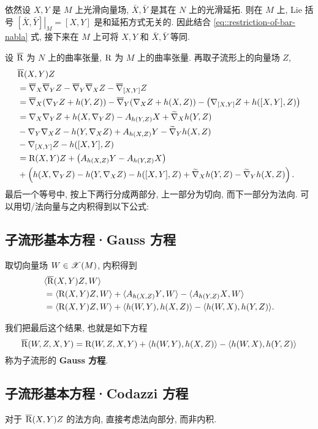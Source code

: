 \documentclass{ctexart}
\begin{document}
依然设 $X, Y$ 是 $M$ 上光滑向量场, $\bar{X}, \bar{Y}$ 是其在 $N$ 上的光滑延拓. 则在 $M$ 上, Lie 括号 $\left.[\bar{X}, \bar{Y}]\right|_{M} = [X, Y]$ 是和延拓方式无关的. 因此结合 \ref{eq::restriction-of-bar-nabla} 式, 接下来在 $M$ 上可将 $X, Y$ 和 $\bar{X}, \bar{Y}$ 等同.

设 $\overline{\mathrm{R}}$ 为 $N$ 上的曲率张量, $\mathrm{R}$ 为 $M$ 上的曲率张量. 再取子流形上的向量场 $Z$,
\begin{align*}
	&\overline{\mathrm{R}}(X, Y)Z \\
	&= \overline{\nabla}_{X}{\overline{\nabla}_{Y}{Z}} - \overline{\nabla}_{Y}{\overline{\nabla}_{X}{Z}} - \overline{\nabla}_{[X, Y]}{Z} \\
	&= \overline{\nabla}_{X}{\left(\nabla_{Y}{Z} + h(Y, Z)\right)} - \overline{\nabla}_{Y}{\left(\nabla_{X}{Z} + h(X, Z)\right)} - \left(\nabla_{[X, Y]}{Z} + h([X, Y], Z)\right) \\
	&= \nabla_{X}{\nabla_{Y}{Z}} + h(X, \nabla_{Y}{Z}) - A_{h(Y, Z)}{X} + \widetilde{\nabla}_{X}{h(Y, Z)} \\
	&- \nabla_{Y}{\nabla_{X}{Z}} - h(Y, \nabla_{X}{Z}) + A_{h(X, Z)}{Y} - \widetilde{\nabla}_{Y}{h(X, Z)} \\
	&- \nabla_{[X, Y]}{Z} - h([X, Y], Z) \\
	&= \mathrm{R}(X, Y)Z + \left(A_{h(X, Z)}{Y} - A_{h(Y, Z)}{X}\right) \\
	&+ \left(h(X, \nabla_{Y}{Z}) - h(Y, \nabla_{X}{Z}) - h([X, Y], Z) + \widetilde{\nabla}_{X}{h(Y, Z)} - \widetilde{\nabla}_{Y}{h(X, Z)}\right).
\end{align*}
最后一个等号中, 按上下两行分成两部分, 上一部分为切向, 而下一部分为法向. 可以用切/法向量与之内积得到以下公式:

\subsection{子流形基本方程·Gauss 方程}
取切向量场 $W \in \mathscr{X}(M)$, 内积得到
\begin{align*}
	&\langle {\overline{\mathrm{R}}(X, Y)Z}, {W} \rangle \\
	&= \langle {\mathrm{R}(X, Y)Z}, {W} \rangle + \langle {A_{h(X, Z)}{Y}}, {W} \rangle - \langle {A_{h(Y, Z)}{X}}, {W} \rangle \\
	&= \langle {\mathrm{R}(X, Y)Z}, {W} \rangle + \langle {h(W, Y)}, {h(X, Z)} \rangle - \langle {h(W, X)}, {h(Y, Z)} \rangle.
\end{align*}

我们把最后这个结果, 也就是如下方程
\begin{equation}\label{eq::Gauss-equation}
	\overline{\mathrm{R}}(W, Z, X, Y) = \mathrm{R}(W, Z, X, Y) + \langle {h(W, Y)}, {h(X, Z)} \rangle - \langle {h(W, X)}, {h(Y, Z)} \rangle
\end{equation}
称为子流形的 {\bf Gauss 方程}.

\subsection{子流形基本方程·Codazzi 方程}
对于 $\overline{\mathrm{R}}(X, Y)Z$ 的法方向, 直接考虑法向部分, 而非内积.
\end{document}
